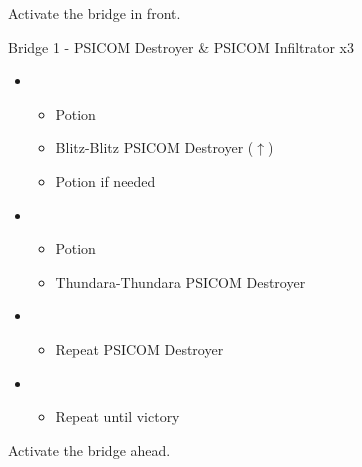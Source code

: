 \begin{multicols}{2}
	Activate the bridge in front.

	\begin{battle}[0:28]{Bridge 1 - PSICOM Destroyer \& PSICOM Infiltrator x3}
		\begin{itemize}
			\item \first
			      \begin{itemize}
				      \item Potion
				      \item Blitz-Blitz PSICOM Destroyer ($\uparrow$)
				      \item Potion if needed
			      \end{itemize}
			\item \second
			      \begin{itemize}
				      \item Potion
				      \item Thundara-Thundara PSICOM Destroyer
			      \end{itemize}
			\item \first
			      \begin{itemize}
				      \item Repeat PSICOM Destroyer
			      \end{itemize}
			\item \fifth
			      \begin{itemize}
				      \item Repeat until victory
			      \end{itemize}
		\end{itemize}
		  
	\end{battle}
	Activate the bridge ahead.
	\vfill


\end{multicols}
